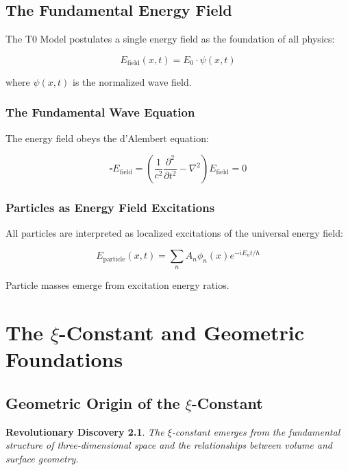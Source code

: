 \documentclass[12pt,a4paper]{report}
\newtheorem{discovery}{Revolutionary Discovery}[chapter]
\begin{document}
	\section{The Fundamental Energy Field}
	
	The T0 Model postulates a single energy field as the foundation of all physics:
	
	\begin{equation}
		E_{\text{field}}(x,t) = E_0 \cdot \psi(x,t)
	\end{equation}
	
	where $\psi(x,t)$ is the normalized wave field.
	
	\subsection{The Fundamental Wave Equation}
	
	The energy field obeys the d'Alembert equation:
	
	\begin{equation}
		\square E_{\text{field}} = \left(\frac{1}{c^2}\frac{\partial^2}{\partial t^2} - \nabla^2\right) E_{\text{field}} = 0
	\end{equation}
	
	\subsection{Particles as Energy Field Excitations}
	
	All particles are interpreted as localized excitations of the universal energy field:
	
	\begin{equation}
		E_{\text{particle}}(x,t) = \sum_n A_n \phi_n(x) e^{-iE_n t/\hbar}
	\end{equation}
	
	Particle masses emerge from excitation energy ratios.
	
	\chapter{The $\xi$-Constant and Geometric Foundations}
	
	\section{Geometric Origin of the $\xi$-Constant}
	
	\begin{discovery}
		The $\xi$-constant emerges from the fundamental structure of three-dimensional space and the relationships between volume and surface geometry.
	\end{discovery}
	
\end{document}
